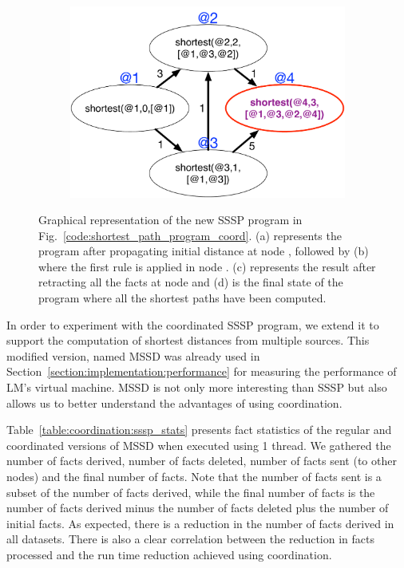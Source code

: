 \begin{figure}
\begin{center}
\begin{subfigure}[b]{0.49\textwidth}
      \caption{}
   \end{subfigure}
   \begin{subfigure}[b]{0.49\textwidth}
      \includegraphics[width=\textwidth]{figures/sssp/coord4}
      \caption{}
   \end{subfigure}
\end{center}
\caption{Graphical representation of the new SSSP program in
   Fig.~\ref{code:shortest_path_program_coord}. (a) represents the
   program after propagating initial distance at node , followed by
   (b) where the first rule is applied in node . (c)
   represents the result after retracting all the  facts at node
    and (d) is the final state of the program where all the shortest paths
   have been computed.}
\label{fig:coordination:new_sssp}
\end{figure}

In order to experiment with the coordinated SSSP program, we extend it to
support the computation of shortest distances from multiple sources. This
modified version, named MSSD was already used in
Section~\ref{section:implementation:performance} for measuring the performance
of LM's virtual machine. MSSD is not only more interesting than SSSP but also
allows us to better understand the advantages of using coordination.

Table~\ref{table:coordination:sssp_stats} presents fact statistics of the
regular and coordinated versions of MSSD when executed using 1 thread. We
gathered the number of facts derived, number of facts deleted, number of facts
sent (to other nodes) and the final number of facts. Note that the number of
facts sent is a subset of the number of facts derived, while the final number of
facts is the number of facts derived minus the number of facts deleted plus the
number of initial facts. As expected, there is a reduction in the number of
facts derived in all datasets. There is also a clear correlation between the
reduction in facts processed and the run time reduction achieved using
coordination.

